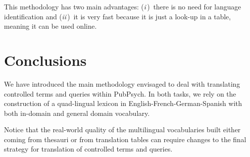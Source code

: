 \documentclass[a4paper,11pt]{article}
\newcommand{\Ni}{({\em i\,})~}
\newcommand{\Nii}{({\em ii\,})~}
\begin{document}
This methodology has two main advantages: \Ni there is no need for language identification and \Nii it is very fast because it is just a look-up in a table, meaning it can be used online.


% 
% 




\section{Conclusions}
\label{s:conclusions}

We have introduced the main methodology envisaged to deal with translating controlled terms and queries within PubPsych. In both tasks, we rely on the construction of a quad-lingual lexicon in English-French-German-Spanish with both in-domain and general domain vocabulary.

Notice that the real-world quality of the multilingual vocabularies built either coming from thesauri or from translation tables can require changes to the final strategy for translation of controlled terms and queries.

%
%
% 
% 
\end{document}
